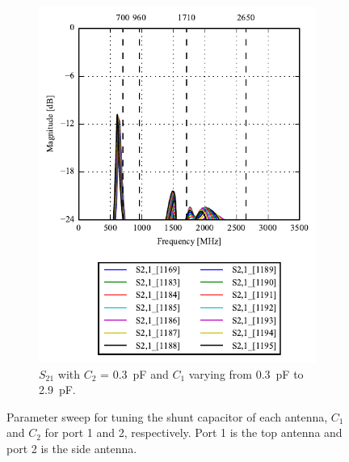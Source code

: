 \begin{figure}[htbp]
\begin{subfigure}[b]{0.49\linewidth}
        \includegraphics{img/tech_sol/monopole/play_mode/s21_s22}
        \caption{$S_{21}$ with $C_2$ = \SI{0.3}{pF} and $C_1$ varying from \SI{0.3}{pF} to \SI{2.9}{pF}.}
        \label{fig:ant1_s22}
    \end{subfigure}
    \caption{Parameter sweep for tuning the shunt capacitor of each antenna, $C_1$ and $C_2$ for port 1 and 2, respectively. Port 1 is the top antenna and port 2 is the side antenna.}
    \label{fig:sparam_mono}
\end{figure}

